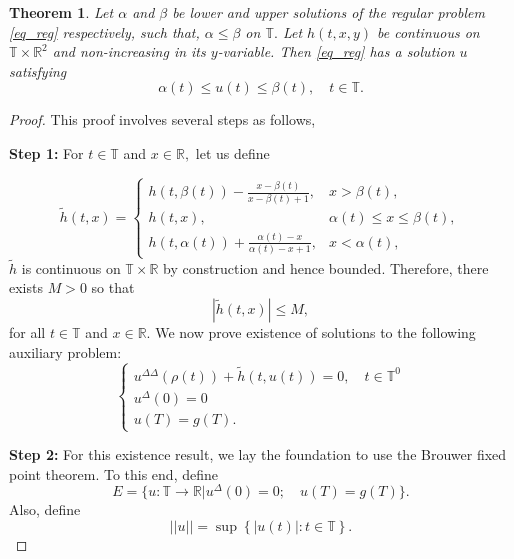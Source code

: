 \documentclass[12pt,reqno]{amsart}
\newtheorem{theorem}{Theorem}[section]
\begin{document}
\begin{theorem}\label{thm_reg}
	Let $\alpha$ and $\beta$ be lower and upper solutions of the regular problem \eqref{eq_reg} respectively, such that, $\alpha \leq \beta$ on $\mathbb{T}.$  Let $h(t, x, y)$ be continuous on $\mathbb{T} \times \mathbb{R}^2$ and non-increasing in its $y$-variable.  Then \eqref{eq_reg} has a solution $u$ satisfying $$\alpha(t) \leq u(t) \leq \beta(t), \quad t \in \mathbb{T}.$$
\end{theorem}
\begin{proof}
This proof involves several steps as follows, 

    \textbf{Step 1:} For $t \in \mathbb{T}$ and $x \in \mathbb{R},$ let us define  
    
	\begin{equation}\label{tilde}
	\tilde{h}(t, x) = \left\{\begin{array}{ll}
	h(t, \beta(t)) - \frac{x - \beta(t)}{x - \beta(t) + 1}, & x > \beta(t), \\
	h(t, x), & \alpha(t) \leq x \leq \beta(t), \\
	h(t, \alpha(t)) + \frac{\alpha(t) - x}{\alpha(t) - x + 1}, & x < \alpha(t),
	\end{array}\right.
	\end{equation}
$\tilde{h}$ is continuous on $\mathbb{T} \times \mathbb{R}$ by construction and hence bounded. Therefore, there exists $M>0$ so that $$\left|\tilde{h}(t, x)\right| \leq M,$$ for all $t \in \mathbb{T}$ and $x \in \mathbb{R}.$
We now prove existence of solutions to the following auxiliary problem:	
\begin{equation}\label{aux}
\begin{cases}
u^{\Delta\Delta}(\rho(t)) + \tilde{h}(t, u(t)) = 0, \quad t \in \mathbb{T}^0\\
u^{\Delta}(0)=0\\
u(T)=g(T).
\end{cases}
\end{equation}
	
	\textbf{Step 2:} For this existence result, we lay the foundation to use the Brouwer fixed point theorem.  To this end, define $$E = \{u : \mathbb{T} \rightarrow \mathbb{R} | u^{\Delta}(0) = 0;\quad u(T) = g(T)\}.$$
	Also, define $$||u|| = \sup\left\{|u(t)| : t \in \mathbb{T}\right\}.$$	
	

\end{proof}
\end{document}
